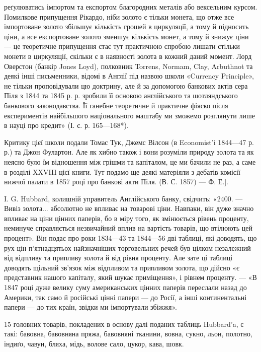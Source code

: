 \parcont{}  %
реґулюватись імпортом та експортом благородних металів або вексельним курсом.
Помилкове припущення Рікардо, ніби золото є тільки монета, що отже все імпортоване
золото збільшує кількість грошей в циркуляції, а тому й підносить ціни,
а все експортоване золото зменшує кількість монет, а тому й знижує ціни —
це теоретичне припущення стає тут практичною спробою лишати стільки
монети в циркуляції, скільки є в наявності золота в кожний даний
момент. Лорд Оверстон (банкір Jones Loyd), полковник Torrens, Normam, Clay,
Arbuthnot та деякі інші письменники, відомі в Англії під назвою школи «Currency
Principle», не тільки проповідували цю доктрину, але й за допомогою банкових
актів сера Піля з 1844 та 1845 р. р. зробили її основою англійського та шотляндського
банкового законодавства. Її ганебне теоретичне й практичне фіяско після
експериментів найбільшого національного маштабу ми зможемо розглянути лише
в науці про кредит» (І. с. р. 165—168*).

Критику цієї школи подали Томас Тук, Джемс Вілсон (в Economist’i 1844—47 р. р.)
та Джон Фулартон. Але як хибно також і вони розуміли природу золота
та як неясно було їм відношення між грішми та капіталом, це ми бачили не
раз, а саме в розділі XXVIII цієї книги. Тут подамо ще деякі матеріяли з дебатів
комісії нижчої палати в 1857 році про банкові акти Піля. (В. С. 1857) — Ф. Е.].

I. G. Hubbard, колишній управитель Англійського банку, свідчить: «2400. —
Вивіз золота... абсолютно не впливає на товарові ціни. Навпаки, він дуже
значно впливає на ціни цінних паперів, бо в міру того, як змінюється рівень
проценту, неминуче справляється незвичайний вплив на вартість товарів, що втілюють
цей процент». Він подає про роки 1834—43 та 1844—56 дві таблиці,
які доводять, що рух цін п’ятнадцятьох найзначніших торговельних речей був
цілком незалежний від відпливу та припливу золота й від рівня проценту. Але
зате ці таблиці доводять щільний зв’язок між відпливом та припливом золота,
що дійсно «є представник нашого капіталу, який шукає приміщення», і рівнем
проценту. — «В 1847 році дуже велику суму американських цінних паперів переслали
назад до Америки, так само й російські цінні папери — до Росії, а інші
континентальні папери — до тих країн, звідки ми імпортували збіжжя».

15 головних товарів, покладених в основу далі поданих таблиць Hubbard’a,
є такі: бавовна, бавовняна пряжа, бавовняні тканини, вовна, сукно,
льон, полотно, індиґо, чавун, бляха, мідь, волове сало, цукор, кава, шовк.

